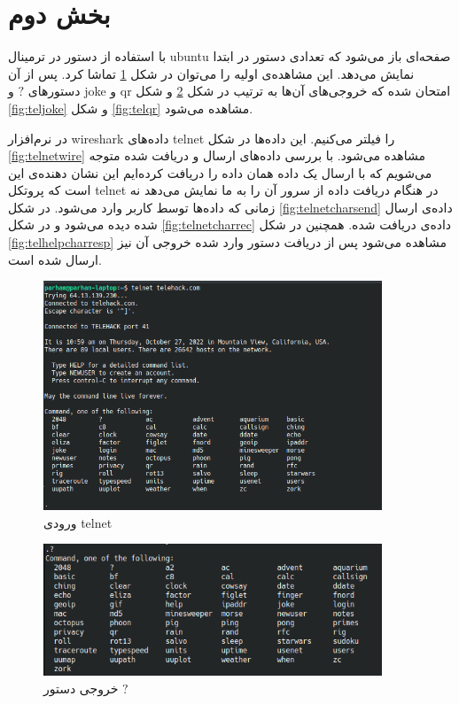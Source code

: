 \documentclass{article}
\begin{document}
\section{بخش دوم}
با استفاده از دستور 
در ترمینال ubuntu صفحه‌ای باز می‌شود که تعدادی دستور در ابتدا نمایش می‌دهد. این مشاهده‌ی اولیه را می‌توان در شکل \ref{fig:telinit} تماشا کرد. پس از آن دستور‌های 
$?$
و joke و qr امتحان شده که خروجی‌های آن‌ها به ترتیب در شکل \ref{fig:telhelp} و شکل \ref{fig:teljoke} و شکل \ref{fig:telqr} مشاهده می‌شود.

در نرم‌افزار wireshark داده‌های telnet را فیلتر می‌کنیم. این داده‌ها در شکل \ref{fig:telnetwire} مشاهده می‌شود. با بررسی داده‌های ارسال و دریافت شده متوجه می‌شویم که با ارسال یک داده همان داده را دریافت کرده‌ایم این نشان دهنده‌ی این است که پروتکل telnet در هنگام دریافت داده از سرور آن را به ما نمایش می‌دهد نه زمانی که داده‌ها توسط کاربر وارد می‌شود. در شکل \ref{fig:telnetcharsend} داده‌ی ارسال شده دیده می‌شود و در شکل \ref{fig:telnetcharrec} داده‌ی دریافت شده. همچنین در شکل \ref{fig:telhelpcharresp} مشاهده می‌شود پس از دریافت دستور وارد شده خروجی آن نیز ارسال شده است.
\begin{figure}[h!]
	\centering
	\includegraphics[width=0.9\textwidth]{src/teleinit.png}
	\caption{
		ورودی telnet
	}
	\label{fig:telinit}
\end{figure}
\begin{figure}[h!]
	\centering
	\includegraphics[width=0.9\textwidth]{src/telhelp.png}
	\caption{
		خروجی دستور $?$
	}
	\label{fig:telhelp}
\end{figure}
\end{document}
